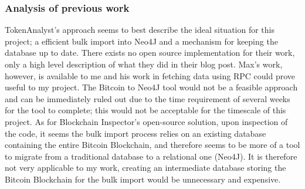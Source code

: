 \subsubsection{Analysis of previous work}
TokenAnalyst's approach seems to best describe the ideal situation for this project; a efficient bulk import into Neo4J and a mechanism for keeping the database up to date. There exists no open source implementation for their work, only a high level description of what they did in their blog post. Max's work, however, is available to me and his work in fetching data using RPC could prove useful to my project. The Bitcoin to Neo4J tool would not be a feasible approach and can be immediately ruled out due to the time requirement of several weeks for the tool to complete; this would not be acceptable for the timescale of this project. As for Blockchain Inspector's open-source solution, upon inspection of the code, it seems the bulk import process relies on an existing database containing the entire Bitcoin Blockchain, and therefore seems to be more of a tool to migrate from a traditional database to a relational one (Neo4J). It is therefore not very applicable to my work, creating an intermediate database storing the Bitcoin Blockchain for the bulk import would be unnecessary and expensive.